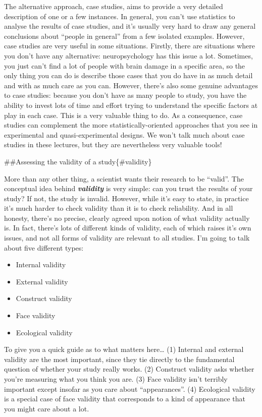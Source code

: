 \documentclass[]{book}
\providecommand{\tightlist}{%
  \setlength{\itemsep}{0pt}\setlength{\parskip}{0pt}}
\begin{document}
The alternative approach, case studies, aims to provide a very detailed description of one or a few instances. In general, you can't use statistics to analyse the results of case studies, and it's usually very hard to draw any general conclusions about ``people in general'' from a few isolated examples. However, case studies are very useful in some situations. Firstly, there are situations where you don't have any alternative: neuropsychology has this issue a lot. Sometimes, you just can't find a lot of people with brain damage in a specific area, so the only thing you can do is describe those cases that you do have in as much detail and with as much care as you can. However, there's also some genuine advantages to case studies: because you don't have as many people to study, you have the ability to invest lots of time and effort trying to understand the specific factors at play in each case. This is a very valuable thing to do. As a consequence, case studies can complement the more statistically-oriented approaches that you see in experimental and quasi-experimental designs. We won't talk much about case studies in these lectures, but they are nevertheless very valuable tools!

\#\#Assessing the validity of a study\{\#validity\}

More than any other thing, a scientist wants their research to be ``valid''. The conceptual idea behind \textbf{\emph{validity}} is very simple: can you trust the results of your study? If not, the study is invalid. However, while it's easy to state, in practice it's much harder to check validity than it is to check reliability. And in all honesty, there's no precise, clearly agreed upon notion of what validity actually is. In fact, there's lots of different kinds of validity, each of which raises it's own issues, and not all forms of validity are relevant to all studies. I'm going to talk about five different types:

\begin{itemize}
\tightlist
\item
  Internal validity
\item
  External validity
\item
  Construct validity
\item
  Face validity
\item
  Ecological validity
\end{itemize}

To give you a quick guide as to what matters here\ldots{} (1) Internal and external validity are the most important, since they tie directly to the fundamental question of whether your study really works. (2) Construct validity asks whether you're measuring what you think you are. (3) Face validity isn't terribly important except insofar as you care about ``appearances''. (4) Ecological validity is a special case of face validity that corresponds to a kind of appearance that you might care about a lot.
\end{document}
